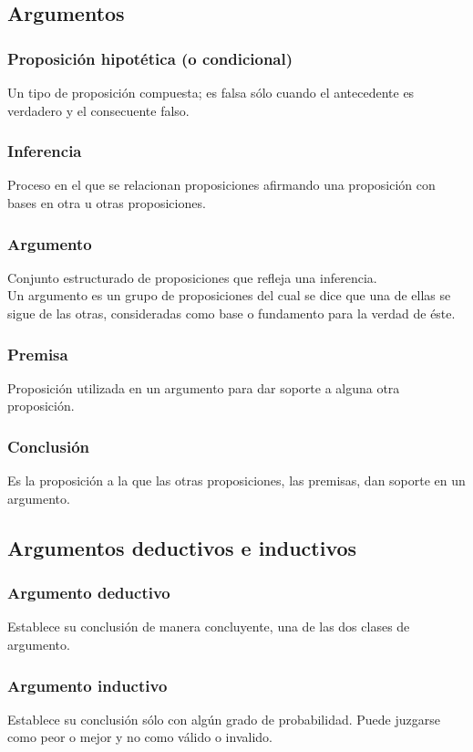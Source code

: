\documentclass[10pt]{book} 						%
\begin{document}
\subsection{Argumentos}
\subsubsection{Proposición hipotética (o condicional)}
Un tipo de proposición compuesta; es falsa sólo cuando el antecedente es verdadero  y el consecuente falso.
\subsubsection{Inferencia}
Proceso en el que se relacionan proposiciones afirmando una proposición con bases en otra u otras proposiciones.
\subsubsection{Argumento}
Conjunto estructurado de proposiciones que refleja una inferencia.\\
Un argumento es un grupo de proposiciones del cual se dice que una de ellas se sigue de las otras, consideradas como base o fundamento para la verdad de éste.
\subsubsection{Premisa}
Proposición utilizada en un argumento para dar soporte a alguna otra proposición.
\subsubsection{Conclusión}
Es la proposición a la que las otras proposiciones, las premisas, dan soporte en un argumento.

\subsection{Argumentos deductivos e inductivos}
\subsubsection{Argumento deductivo}
Establece su conclusión de manera concluyente, una de las dos clases de argumento.
\subsubsection{Argumento inductivo}
Establece su conclusión sólo con algún grado de probabilidad. Puede juzgarse como peor o mejor y no como válido o invalido.
\end{document}
